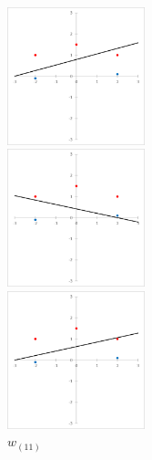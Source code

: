\begin{figure}[H]
    \begin{minipage}{0.3\hsize}
        \begin{center}
            \includegraphics[width=40mm]{./figures/section_2/image9.eps}
            \captionsetup{labelformat=empty,labelsep=none}
            \caption{$w_{(9)}$}
        \end{center}
    \end{minipage}
    \begin{minipage}{0.3\hsize}
        \begin{center}
            \includegraphics[width=40mm]{./figures/section_2/image10.eps}
            \captionsetup{labelformat=empty,labelsep=none}
            \caption{$w_{(10)}$}
        \end{center}
    \end{minipage}
    \begin{minipage}{0.3\hsize}
        \begin{center}
            \includegraphics[width=40mm]{./figures/section_2/image11.eps}
            \captionsetup{labelformat=empty,labelsep=none}
            \caption{$w_{(11)}$}
        \end{center}
    \end{minipage}
\end{figure}
